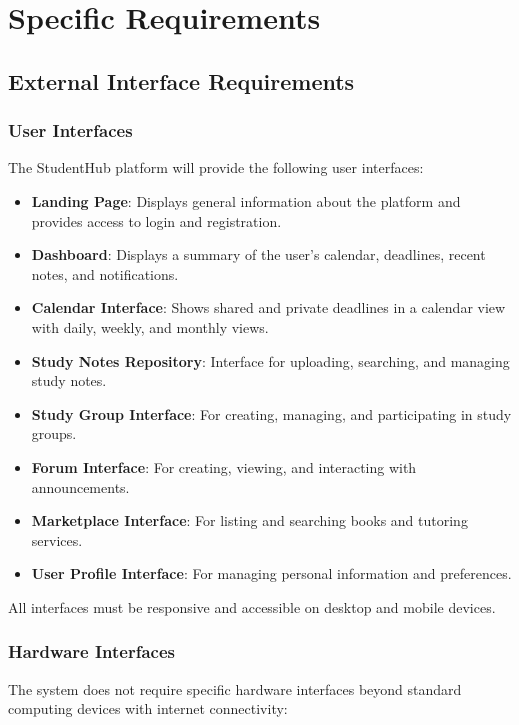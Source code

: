 \documentclass{article}
\begin{document}
\clearpage
\section{Specific Requirements}

\subsection{External Interface Requirements}

\subsubsection{User Interfaces}
The StudentHub platform will provide the following user interfaces:

\begin{itemize}
    \item \textbf{Landing Page}: Displays general information about the platform and provides access to login and registration.
    \item \textbf{Dashboard}: Displays a summary of the user's calendar, deadlines, recent notes, and notifications.
    \item \textbf{Calendar Interface}: Shows shared and private deadlines in a calendar view with daily, weekly, and monthly views.
    \item \textbf{Study Notes Repository}: Interface for uploading, searching, and managing study notes.
    \item \textbf{Study Group Interface}: For creating, managing, and participating in study groups.
    \item \textbf{Forum Interface}: For creating, viewing, and interacting with announcements.
    \item \textbf{Marketplace Interface}: For listing and searching books and tutoring services.
    \item \textbf{User Profile Interface}: For managing personal information and preferences.
\end{itemize}

All interfaces must be responsive and accessible on desktop and mobile devices.

\subsubsection{Hardware Interfaces}
The system does not require specific hardware interfaces beyond standard computing devices with internet connectivity:
\end{document}
